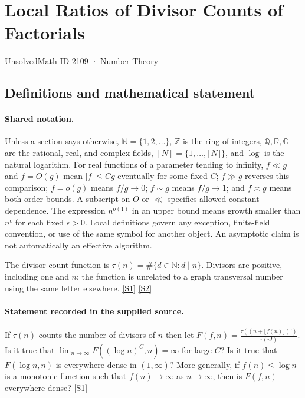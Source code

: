 \documentclass[11pt,a4paper]{article}
\newcommand{\N}{\mathbb{N}}
\newcommand{\Z}{\mathbb{Z}}
\newcommand{\Q}{\mathbb{Q}}
\newcommand{\R}{\mathbb{R}}
\newcommand{\C}{\mathbb{C}}
\newcommand{\sref}[2]{\hyperlink{source:#1:#2}{[S#2]}}
\begin{document}

\setcounter{section}{2108}

\section{Local Ratios of Divisor Counts of Factorials}\label{2109}

{\small\sffamily UnsolvedMath ID 2109 · Number Theory}

\subsection{Definitions and mathematical statement}

\paragraph{Shared notation.}Unless a section says otherwise, $\N=\{1,2,\ldots\}$,
$\Z$ is the ring of integers, $\Q,\R,\C$ are the rational, real, and complex
fields, $[N]=\{1,\ldots,\lfloor N\rfloor\}$, and $\log$ is the natural
logarithm. For real functions of a parameter tending to infinity,
$f\ll g$ and $f=O(g)$ mean $|f|\leq Cg$ eventually for some fixed $C$;
$f\gg g$ reverses this comparison; $f=o(g)$ means $f/g\to0$;
$f\sim g$ means $f/g\to1$; and $f\asymp g$ means both order bounds.
A subscript on $O$ or $\ll$ specifies allowed constant dependence.
The expression $n^{o(1)}$ in an upper bound means growth smaller than
$n^\epsilon$ for each fixed $\epsilon>0$. Local definitions govern any
exception, finite-field convention, or use of the same symbol for another
object. An asymptotic claim is not automatically an effective algorithm.



The divisor-count function is $\tau(n)=\#\{d\in\N:d\mid n\}$. Divisors are positive, including one and $n$; the function is unrelated to a graph transversal number using the same letter elsewhere. \sref{2109}{1} \sref{2109}{2}

\paragraph{Statement recorded in the supplied source.}
If $\tau(n)$ counts the number of divisors of $n$ then let $ F(f,n)=\frac{\tau((n+\lfloor f(n)\rfloor)!)}{\tau(n!)}. $ Is it true that $ \lim_{n\to \infty}F((\log n)^C,n)=\infty $ for large $C$?
Is it true that $F(\log n,n)$ is everywhere dense in $(1,\infty)$?
More generally, if $f(n)\leq \log n$ is a monotonic function such that $f(n)\to \infty$ as $n\to \infty$, then is $F(f,n)$ everywhere dense? \sref{2109}{1}
\end{document}
